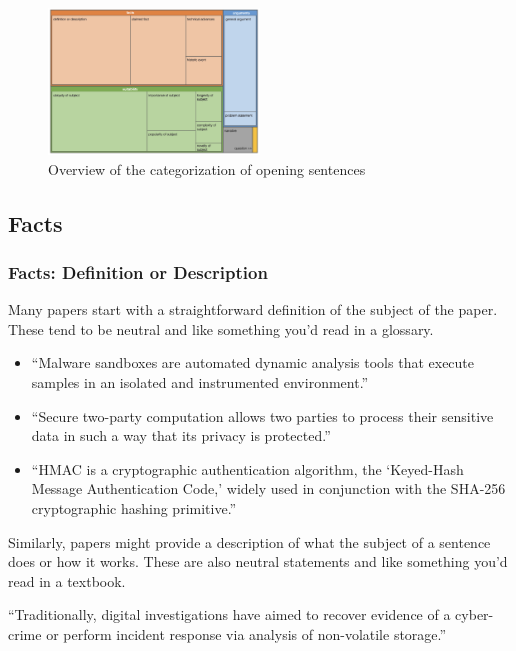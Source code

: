 \documentclass[sigconf]{acmart}
\begin{document}
	\label{sec:categories}
	\begin{figure}[t]
		\centering
		\includegraphics[width=0.5\textwidth]{image.png}
		\caption{Overview of the categorization of opening sentences}
		\label{fig:overview}
	\end{figure}
	\subsection{Facts}
	\subsubsection{Facts: Definition or Description}
	
	Many papers start with a straightforward definition of the subject of the paper. These tend to be neutral and like something you’d read in a glossary.

\begin{itemize}
	
\item	``Malware sandboxes are automated dynamic analysis tools that execute samples in an isolated and instrumented environment.''
	
\item	``Secure two-party computation allows two parties to process their sensitive data in such a way that its privacy is protected.''
	
\item	``HMAC is a cryptographic authentication algorithm, the ‘Keyed-Hash Message Authentication Code,’ widely used in conjunction with the SHA-256 cryptographic hashing primitive.''

\end{itemize} 
	
	Similarly, papers might provide a description of what the subject of a sentence does or how it works. These are also neutral statements and like something you’d read in a textbook. 


	
	``Traditionally, digital investigations have aimed to recover evidence of a cyber-crime or perform incident response via analysis of non-volatile storage.''
	
\end{document}
